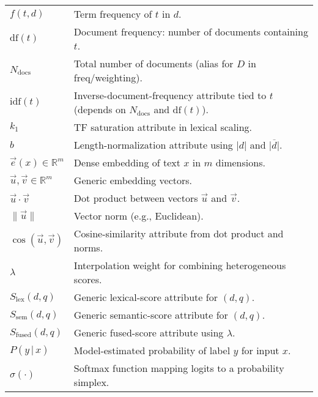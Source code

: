 \begin{longtable}{p{} p{}}
$f(t,d)$               & Term frequency of $t$ in $d$. \\
$\mathrm{df}(t)$       & Document frequency: number of documents containing $t$. \\
$N_{\text{docs}}$      & Total number of documents (alias for $D$ in freq/weighting). \\
$\mathrm{idf}(t)$      & Inverse-document-frequency attribute tied to $t$ (depends on $N_{\text{docs}}$ and $\mathrm{df}(t)$). \\
$k_1$                  & TF saturation attribute in lexical scaling. \\
$b$                    & Length-normalization attribute using $|d|$ and $\overline{|d|}$. \\

$\vec{e}(x)\in\mathbb{R}^{m}$ & Dense embedding of text $x$ in $m$ dimensions. \\
$\vec{u},\vec{v}\in\mathbb{R}^{m}$ & Generic embedding vectors. \\
$\vec{u}\cdot \vec{v}$  & Dot product between vectors $\vec{u}$ and $\vec{v}$. \\
$\|\vec{u}\|$           & Vector norm (e.g., Euclidean). \\
$\cos(\vec{u},\vec{v})$ & Cosine-similarity attribute from dot product and norms. \\

$\lambda$               & Interpolation weight for combining heterogeneous scores. \\
$S_{\text{lex}}(d,q)$   & Generic lexical-score attribute for $(d,q)$. \\
$S_{\text{sem}}(d,q)$   & Generic semantic-score attribute for $(d,q)$. \\
$S_{\text{fused}}(d,q)$ & Generic fused-score attribute using $\lambda$. \\

$P(y\,|\,x)$            & Model-estimated probability of label $y$ for input $x$. \\
$\sigma(\cdot)$         & Softmax function mapping logits to a probability simplex. \\
\end{longtable}
